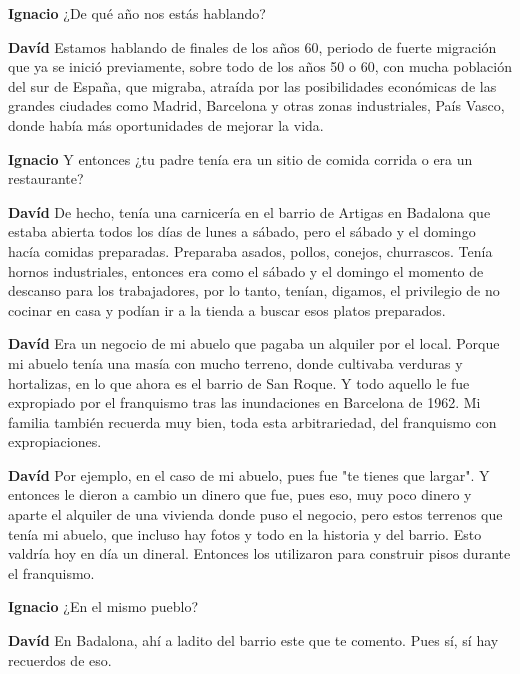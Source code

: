 \documentclass[
  spanish,
  11pt,
  a4paper,
]{scrbook}
\newenvironment{transcripcion}{
    \begin{list}{}{
        \setlength{\leftmargin}{1.5em}  %
        \setlength{\rightmargin}{0em}
        \setlength{\itemsep}{0.2em}     %
        \setlength{\parsep}{0.0em}
        \setlength{\listparindent}{0pt}
    }
}{
    \end{list}
}
\newcommand{\personaje}[1]{\textbf{#1}\quad}
\begin{document}
\begin{transcripcion}
\item \personaje{Ignacio} ¿De qué año nos estás hablando?

\item \personaje{Davíd} Estamos hablando de finales de los años 60, periodo de fuerte migración que ya se inició previamente, sobre todo de los años 50 o 60, con mucha población del sur de España, que migraba, atraída por las posibilidades económicas de las grandes ciudades como Madrid, Barcelona y otras zonas industriales, País Vasco, donde había más oportunidades de mejorar la vida.

\item \personaje{Ignacio} Y entonces ¿tu padre tenía era un sitio de comida corrida o era un restaurante?

\item \personaje{Davíd} De hecho, tenía una carnicería en el barrio de Artigas en Badalona que estaba abierta todos los días de lunes a sábado, pero el sábado y el domingo hacía comidas preparadas. Preparaba asados, pollos, conejos, churrascos. Tenía hornos industriales, entonces era como el sábado y el domingo el momento de descanso para los trabajadores, por lo tanto, tenían, digamos, el privilegio de no cocinar en casa y podían ir a la tienda a buscar esos platos preparados.

\item \personaje{Davíd} Era un negocio de mi abuelo que pagaba un alquiler por el local. Porque mi abuelo tenía una masía con mucho terreno, donde cultivaba verduras y hortalizas, en lo que ahora es el barrio de San Roque. Y todo aquello le fue expropiado por el franquismo tras las inundaciones en Barcelona de 1962. Mi familia también recuerda muy bien, toda esta arbitrariedad, del franquismo con expropiaciones.

\item \personaje{Davíd} Por ejemplo, en el caso de mi abuelo, pues fue "te tienes que largar". Y entonces le dieron a cambio un dinero que fue, pues eso, muy poco dinero y aparte el alquiler de una vivienda donde puso el negocio, pero estos terrenos que tenía mi abuelo, que incluso hay fotos y todo en la historia y del barrio. Esto valdría hoy en día un dineral. Entonces los utilizaron para construir pisos durante el franquismo.

\item \personaje{Ignacio} ¿En el mismo pueblo?

\item \personaje{Davíd} En Badalona, ahí a ladito del barrio este que te comento. Pues sí, sí hay recuerdos de eso.


\end{transcripcion}
\end{document}
